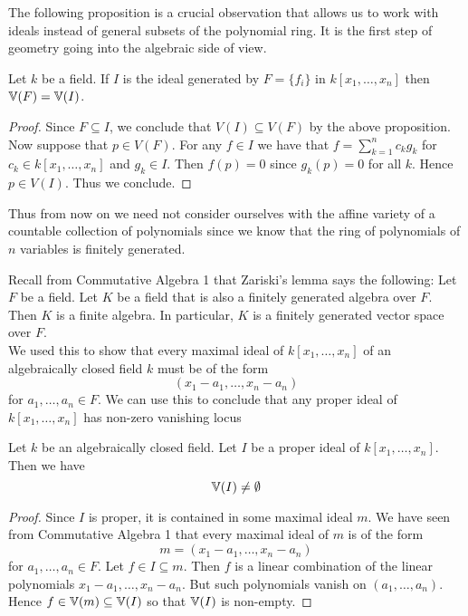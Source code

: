\documentclass[a4paper]{article}
\begin{document}
The following proposition is a crucial observation that allows us to work with ideals instead of general subsets of the polynomial ring. It is the first step of geometry going into the algebraic side of view. 

\begin{prp}{}{} Let $k$ be a field. If $I$ is the ideal generated by $F=\{f_i\}$ in $k[x_1,\dots,x_n]$ then $\mathbb{V}(F)=\mathbb{V}(I)$. \tcbline
\begin{proof}
Since $F\subseteq I$, we conclude that $V(I)\subseteq V(F)$ by the above proposition. Now suppose that $p\in V(F)$. For any $f\in I$ we have that $f=\sum_{k=1}^nc_kg_k$ for $c_k\in k[x_1,\dots,x_n]$ and $g_k\in I$. Then $f(p)=0$ since $g_k(p)=0$ for all $k$. Hence $p\in V(I)$. Thus we conclude. 
\end{proof}
\end{prp}

Thus from now on we need not consider ourselves with the affine variety of a countable collection of polynomials since we know that the ring of polynomials of $n$ variables is finitely generated. 

Recall from Commutative Algebra 1 that Zariski's lemma says the following: Let $F$ be a field. Let $K$ be a field that is also a finitely generated algebra over $F$. Then $K$ is a finite algebra. In particular, $K$ is a finitely generated vector space over $F$. \\

We used this to show that every maximal ideal of $k[x_1,\dots,x_n]$ of an algebraically closed field $k$ must be of the form $$(x_1-a_1,\dots,x_n-a_n)$$ for $a_1,\dots,a_n\in F$. We can use this to conclude that any proper ideal of $k[x_1,\dots,x_n]$ has non-zero vanishing locus

\begin{lmm}{}{} Let $k$ be an algebraically closed field. Let $I$ be a proper ideal of $k[x_1,\dots,x_n]$. Then we have $$\mathbb{V}(I)\neq\emptyset$$ \tcbline
\begin{proof}
Since $I$ is proper, it is contained in some maximal ideal $m$. We have seen from Commutative Algebra 1 that every maximal ideal of $m$ is of the form $$m=(x_1-a_1,\dots,x_n-a_n)$$ for $a_1,\dots,a_n\in F$. Let $f\in I\subseteq m$. Then $f$ is a linear combination of the linear polynomials $x_1-a_1,\dots,x_n-a_n$. But such polynomials vanish on $(a_1,\dots,a_n)$. Hence $f\in\mathbb{V}(m)\subseteq\mathbb{V}(I)$ so that $\mathbb{V}(I)$ is non-empty. 
\end{proof}
\end{lmm}
\end{document}
